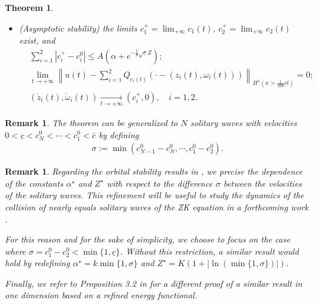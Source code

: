 \documentclass[reqno,10pt]{amsart}
\newtheorem{theo}[lemm]{Theorem}
\newtheorem{rema}[lemm]{Remark}
\numberwithin{equation}{section}
\begin{document}
\begin{theo}
\begin{itemize}
  
			\item[(ii)] (Asymptotic stability) the limits $c_1^+=\lim_{+\infty} c_1(t)$, $c_2^+=\lim_{+\infty}c_2(t)$ exist, and  
			\begin{align}
               & \sum_{i=1}^2\left\vert c_i^+ - c_i^0 \right\vert \leq A \left( \alpha + e^{-\frac18 \sqrt{\underline{c}}Z } \right); \\
				&\lim_{t\rightarrow +\infty} \left\| u(t) - \sum_{i=1}^2 Q_{c_i(t)} \left( \cdot - \left( z_i(t), \omega_i(t) \right) \right) \right\|_{H^1(x>\frac{1}{100}\underline{c} t)} = 0 ; \label{conv_asymp}
                \\ & (\dot{z}_i(t),\dot{\omega}_i(t)) \underset{t \rightarrow + \infty}{\longrightarrow} (c_i^+,0), \quad i=1,2 . \nonumber
			\end{align}
		\end{itemize}
	\end{theo}
	
	\begin{rema}
		The theorem can be generalized to $N$ solitary waves with velocities $0<\underline{c}< c_N^0 < \cdots < c_1^0< \bar{c}$ by defining
		\begin{align*}
			\sigma := \min \left(c_{N-1}^0 - c_N^0, \cdots, c_1^0-c_2^0 \right).
		\end{align*}
	\end{rema} 
	
	\begin{rema} Regarding the orbital stability results in \cite{MMT02,CMPS16}, we precise the dependence of the constants $\alpha^\star$ and $Z^\star$ with respect to the difference $\sigma$ between the velocities of the solitary waves. This refinement will be useful to study the dynamics of the collision of nearly equals solitary waves of the ZK equation in a forthcoming work \cite{PV23}.  
		
		For this reason and for the sake of simplicity, we choose to focus on the case where $\sigma=c_1^0-c_2^0 < \min\{1,\underline{c} \}$. Without this restriction, a similar result would hold by redefining $\alpha^\star=k \min\{1,\sigma\}$ and $Z^\star=K\left(1+|\ln(\min\{1,\sigma\})|\right)$.
		
		Finally, we refer to Proposition 3.2 in \cite{MM11} for a different proof of a similar result in one dimension based on a refined energy functional. 
	\end{rema}
\end{document}

